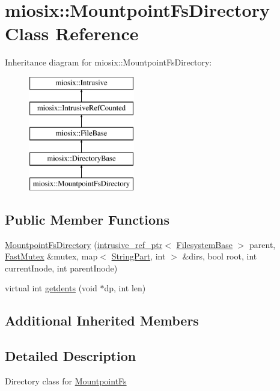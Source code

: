 \hypertarget{classmiosix_1_1_mountpoint_fs_directory}{\section{miosix\-:\-:Mountpoint\-Fs\-Directory Class Reference}
\label{classmiosix_1_1_mountpoint_fs_directory}
}
Inheritance diagram for miosix\-:\-:Mountpoint\-Fs\-Directory\-:\begin{figure}[H]
\begin{center}
\leavevmode
\includegraphics[height=5.000000cm]{classmiosix_1_1_mountpoint_fs_directory}
\end{center}
\end{figure}
\subsection*{Public Member Functions}
\begin{DoxyCompactItemize}
\item 
\hyperlink{classmiosix_1_1_mountpoint_fs_directory_ad7e993495e2119b88e0fb07a37f8dd47}{Mountpoint\-Fs\-Directory} (\hyperlink{classmiosix_1_1intrusive__ref__ptr}{intrusive\-\_\-ref\-\_\-ptr}$<$ \hyperlink{classmiosix_1_1_filesystem_base}{Filesystem\-Base} $>$ parent, \hyperlink{classmiosix_1_1_fast_mutex}{Fast\-Mutex} \&mutex, map$<$ \hyperlink{classmiosix_1_1_string_part}{String\-Part}, int $>$ \&dirs, bool root, int current\-Inode, int parent\-Inode)
\item 
virtual int \hyperlink{classmiosix_1_1_mountpoint_fs_directory_aeba5b518b43106859b68bff8f7ef01b1}{getdents} (void $\ast$dp, int len)
\end{DoxyCompactItemize}
\subsection*{Additional Inherited Members}


\subsection{Detailed Description}
Directory class for \hyperlink{classmiosix_1_1_mountpoint_fs}{Mountpoint\-Fs} 

